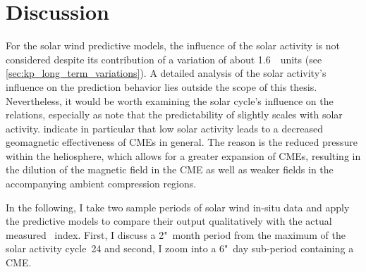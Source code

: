 \section{Discussion}
\label{sec:discussion_ch2}
For the solar wind predictive \Kp{} models, the influence of the solar activity is not considered despite its contribution of a variation of about 1.6~\Kp~units (see \autoref{sec:kp_long_term_variations}). A detailed analysis of the solar activity's influence on the \Kp{} prediction behavior lies outside the scope of this thesis. Nevertheless, it would be worth examining the solar cycle's influence on the relations, especially as \citet{Wing2005} note that the predictability of \Kp{} slightly scales with solar activity.
\citet{Gopalswamy2014} indicate in particular that low solar activity leads to a decreased geomagnetic effectiveness of CMEs in general. The reason is the reduced pressure within the heliosphere, which allows for a greater expansion of CMEs, resulting in the dilution of the magnetic field in the CME as well as weaker fields in the accompanying ambient compression regions.


In the following, I take two sample periods of solar wind in-situ data and apply the predictive \Kp{} models to compare their output qualitatively with the actual measured \Kp~index. First, I discuss a 2"~month period from the maximum of the solar activity cycle~24 and second, I zoom into a 6"~day sub-period containing a CME.

